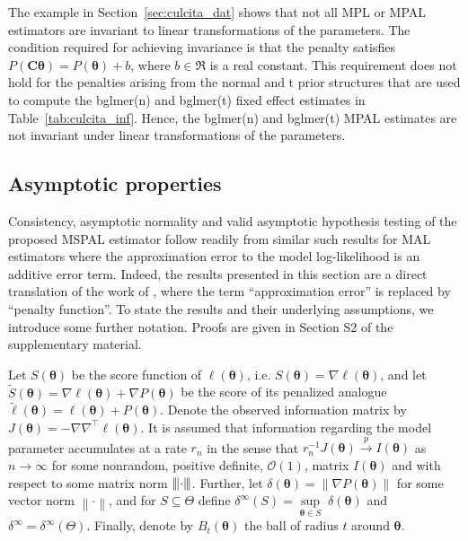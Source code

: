 \documentclass[11pt, a4paper]{article}
\newcommand*{\bb}{\boldsymbol}
\newcommand{\vnorm}[1]{\ensuremath{{\left\| #1 \right\|}}}
\newcommand{\mnorm}[1]{{\left\vert\kern-0.25ex\left\vert\kern-0.25ex\left\vert #1 
		\right\vert\kern-0.25ex\right\vert\kern-0.25ex\right\vert}}
\theoremstyle{example} \newtheorem{example}{Example}[section]
\theoremstyle{theorem} \newtheorem{theorem}{Theorem}[section]
\def\btheta{\bb{\theta}}
\def\bC{\bb{C}}
\begin{document}
The example in Section~\ref{sec:culcita_dat} shows that not all MPL or
MPAL estimators are invariant to linear transformations of the
parameters. The condition required for achieving invariance is that
the penalty satisfies $P(\bC\btheta) = P(\btheta) + b$, where
$b \in \Re$ is a real constant. This requirement does not hold for
the penalties arising from the normal and t prior structures that are
used to compute the bglmer(n) and bglmer(t) fixed effect estimates in Table~\ref{tab:culcita_inf}. Hence, the bglmer(n) and
bglmer(t) MPAL estimates are not invariant under linear
transformations of the parameters.

\subsection{Asymptotic properties}
\label{sec:ass+res}

Consistency, asymptotic normality and valid asymptotic hypothesis testing of the proposed MSPAL estimator follow readily from similar such results for MAL estimators where the approximation error to the model log-likelihood is an additive error term. Indeed, the results presented in this section are a direct translation of the work of \citet{ogden:2017}, where the term ``approximation error'' is replaced by ``penalty function''. To state the results and their underlying assumptions, we introduce some further notation. Proofs are given in Section S2 of the supplementary material.

Let $S(\btheta) $ be the score function of $\ell(\btheta)$, i.e. $S(\btheta ) =\nabla \ell(\btheta)$, and let $\tilde{S}(\btheta) = \nabla\ell(\btheta) + \nabla P(\btheta)$ be the score of its penalized analogue $\tilde{\ell}(\btheta) = \ell(\btheta)+P(\btheta)$. Denote the observed information matrix by $J(\btheta) = -\nabla \nabla^\top \ell(\btheta)$. It is assumed that information regarding the model parameter accumulates at a rate $r_n$ in the sense that $r_n^{-1}J(\btheta ) \overset{p}{\to} I(\btheta)$ as $n \to \infty$ for some nonrandom, positive definite, $\mathcal{O}(1)$, matrix $I(\btheta)$ and with respect to some matrix norm $\mnorm{\cdot}$. Further, let $\delta(\btheta) = \vnorm{\nabla P(\btheta)}$ %
for some vector norm $\vnorm{\cdot}$, and for $S \subseteq \Theta$ define $\delta^\infty(S)  = \underset{\btheta \in S}{\sup} \; \delta(\btheta)$ and $\delta^\infty = \delta^\infty(\Theta)$. Finally, denote by $B_t(\btheta)$ the ball of radius $t$ around $\btheta$. 
\end{document}
